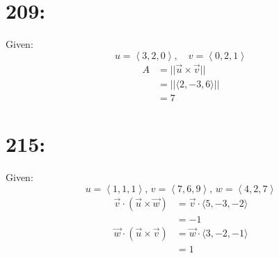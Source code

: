 \documentclass[a4paper,12pt,openany]{article}
\newcommand{\crossp}[2]{
    \vec{#1} \times \vec{#2}
}
\newcommand{\vcomponents}[4]{
    #1 = \left\langle #2, #3, #4 \right\rangle
}
\begin{document}
\begin{multicols*}{2}
\section*{209:}
Given:
\[
    \vcomponents{u}{3}{2}{0}, \quad \vcomponents{v}{0}{2}{1}
\]
\begin{align*}
    A &= ||\crossp{u}{v}|| \\
    &= ||\langle 2, -3, 6 \rangle|| \\
    &= 7 
\end{align*}

\section*{215:}
Given:
\[
    \vcomponents{u}{1}{1}{1}, \, \vcomponents{v}{7}{6}{9}, \, \vcomponents{w}{4}{2}{7}
\]
\begin{align*}
    \vec{v} \cdot (\vec{u} \times \vec{w}) &= \vec{v} \cdot \langle 5, -3, -2 \rangle \\
    &= -1 \\
    \vec{w} \cdot (\vec{u} \times \vec{v}) &= \vec{w} \cdot \langle 3, -2, -1 \rangle \\
    &= 1 
\end{align*}
\end{multicols*}
\end{document}
